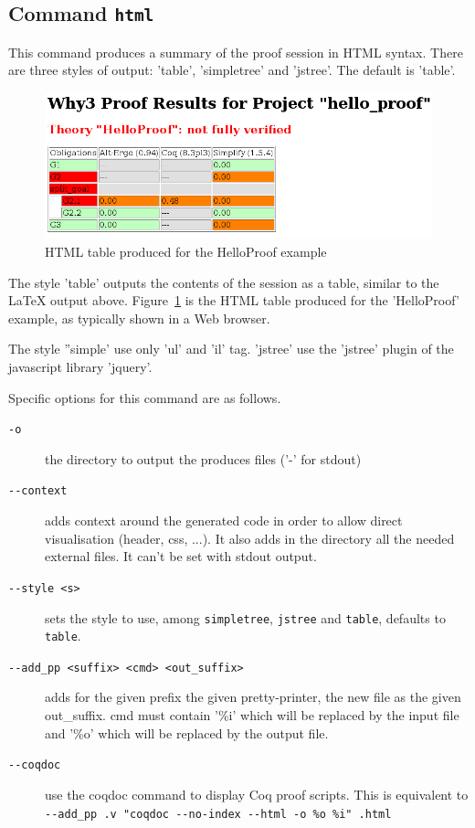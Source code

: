 \subsection{Command \texttt{html}}

This command produces a summary of the proof session in HTML syntax.
There are three styles of output: 'table', 'simpletree' and
'jstree'. The default is 'table'.

\begin{figure}[t]
  \begin{center}
    \includegraphics[width=\textwidth]{hello_proof.png}
  \end{center}
  \caption{HTML table produced for the HelloProof example}
\label{fig:html}
\end{figure}

The style 'table' outputs the contents of the session as a table,
similar to the LaTeX output above. Figure~\ref{fig:html} is the HTML table
produced for the 'HelloProof' example, as typically shown in a Web
browser.

The style ''simple' use only 'ul' and 'il' tag. 'jstree' use the 'jstree' plugin
of the javascript library 'jquery'.



Specific options for this command are as follows.
\begin{description}
\item[\texttt{-o}] 
the directory to output the produces files ('-' for stdout)

\item[\texttt{-{}-context}] adds context around the generated code in
  order to allow direct visualisation (header, css, ...). It also adds
  in the directory all the needed external files. It can't be set with
  stdout output.

\item[\texttt{-{}-style <s>}] sets the style to
  use, among \texttt{simpletree}, \texttt{jstree} and \texttt{table}, defaults to \texttt{table}.

\item[\texttt{-{}-add\_pp <suffix> <cmd> <out\_suffix>}] adds for the
  given prefix the given pretty-printer, the new file as the given
  out\_suffix. cmd must contain
  '\%i' which will be replaced by the input file
                         and '\%o' which will be replaced by the
                         output file.

\item[\texttt{-{}-coqdoc}] use the coqdoc command to display Coq proof
  scripts. This is equivalent to \texttt{-{}-add\_pp .v "coqdoc
    -{}-no-index -{}-html -o \%o \%i" .html}

\end{description}
 
